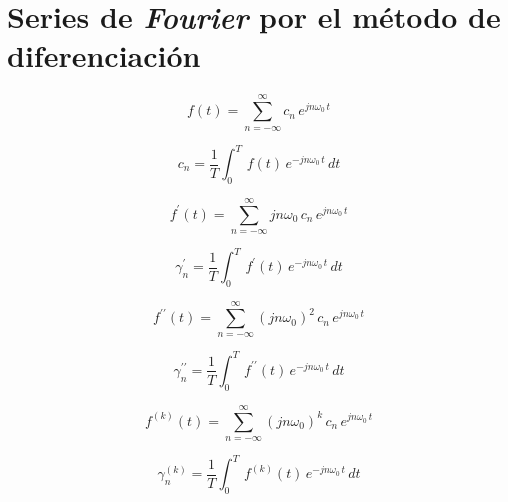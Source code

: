 \section{Series de \emph{Fourier} por el método de diferenciación}
\begin{minipage}{.5\linewidth}
    \begin{equation*}
        f(t)=\sum_{n=-\infty}^{\infty}c_n\,e^{jn\omega_0\,t}
    \end{equation*}
\end{minipage}
\begin{minipage}{.5\linewidth}
    \begin{equation*}
        c_n=\frac{1}{T}\int_0^T\,f(t)\,e^{-jn\omega_0\,t}\,dt
    \end{equation*}
\end{minipage}
\begin{minipage}{.5\linewidth}
    \begin{equation*}
        f^\prime(t)=\sum_{n=-\infty}^{\infty}jn\omega_0\,c_n\,e^{jn\omega_0\,t}
    \end{equation*}
\end{minipage}
\begin{minipage}{.5\linewidth}
    \begin{equation}
        \gamma^\prime_n=\frac{1}{T}\int_0^T\,f^\prime(t)\,e^{-jn\omega_0\,t}\,dt
    \end{equation}
\end{minipage}
\begin{minipage}{.5\linewidth}
    \begin{equation*}
        f^{\prime\prime}(t)
            =\sum_{n=-\infty}^{\infty}{(jn\omega_0)}^2\,c_n\,e^{jn\omega_0\,t}
    \end{equation*}
\end{minipage}
\begin{minipage}{.5\linewidth}
    \begin{equation}
        \gamma^{\prime\prime}_n
            =\frac{1}{T}\int_0^T\,f^{\prime\prime}(t)\,e^{-jn\omega_0\,t}\,dt
    \end{equation}
\end{minipage}
\begin{minipage}{.5\linewidth}
    \begin{equation*}
        f^{(k)}(t)
            =\sum_{n=-\infty}^{\infty}{(jn\omega_0)}^k\,c_n\,e^{jn\omega_0\,t}
    \end{equation*}
\end{minipage}
\begin{minipage}{.5\linewidth}
    \begin{equation}
        \gamma^{(k)}_n
            =\frac{1}{T}\int_0^T\,f^{(k)}(t)\,e^{-jn\omega_0\,t}\,dt
    \end{equation}
\end{minipage}

